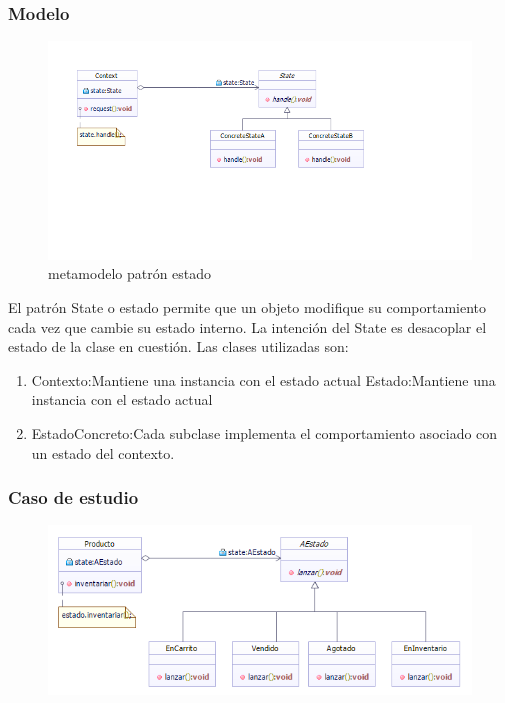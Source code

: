 \subsubsection{Modelo}
\begin{figure}[th!]
	\centering
	\includegraphics[width=0.7\linewidth]{arquitectura/imagenes/PatronEstado}
	\caption{metamodelo patrón estado}
	\label{fig:metamodelo patron estado}
\end{figure}
El patrón State o estado permite que un objeto modifique su comportamiento cada vez que cambie su estado interno. La intención del State es desacoplar el estado de la clase en cuestión. Las clases utilizadas son:
\begin{enumerate}
	\item Contexto:Mantiene una instancia con el estado actual Estado:Mantiene una instancia con el estado actual
	\item EstadoConcreto:Cada subclase implementa el comportamiento asociado con un estado del contexto.
\end{enumerate}  
\newpage

\subsubsection{Caso de estudio}
\begin{figure}[th!]
	\centering
	\includegraphics[width=0.7\linewidth]{arquitectura/imagenes/PatronEstadoCasoEstudio}
	\caption{}
	\label{fig:patronestadocasoestudio}
\end{figure}


